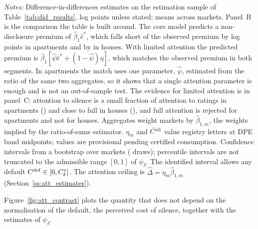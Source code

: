 \begin{table}[htbp]
\centering
\caption{The Non-Disclosure Premium under the Core Model and under Limited Attention}
\label{tab:attention}
\small\renewcommand{\arraystretch}{1.3}


\vspace{0.5em}
\raggedright
\footnotesize
\textit{Notes:} Difference-in-differences estimates on the estimation sample of Table~\ref{tab:did_results}, log points unless stated; means across markets. Panel~B is the comparison the table is built around. The core model predicts a non-disclosure premium of $\hat\beta_1\hat e^*$, which falls short of the observed premium by \attLamApt{} log points in apartments and by \attLamHouse{} in houses. With limited attention the predicted premium is $\hat\beta_1[\hat\psi\hat e^*+(1-\hat\psi)\eta]$, which matches the observed premium in both segments. In apartments the match uses one parameter, $\hat\psi$, estimated from the ratio of the same two aggregates, so it shows that a single attention parameter is enough and is not an out-of-sample test. The evidence for limited attention is in panel~C: attention to silence is a small fraction of attention to ratings in apartments (\attPsiApt{}) and close to full in houses (\attPsiHouse{}), and full attention is rejected for apartments and not for houses. Aggregates weight markets by $\hat\beta_{1,m}$, the weights implied by the ratio-of-sums estimator. $\eta_m$ and $\bar C^{\rm sil}$ value registry letters at DPE band midpoints; values are provisional pending certified consumption. Confidence intervals from a bootstrap over markets (\attNBoot{} draws); percentile intervals are not truncated to the admissible range $[0,1]$ of $\psi_\delta$. The identified interval allows any default $C^{\rm def}\in[0,C^*_\delta]$. The attention ceiling is $\hat\Delta=\eta_m\hat\beta_{1,m}$ (Section~\ref{ss:att_estimates}).
\end{table}


Figure~\ref{fig:att_contrast} plots the quantity that does not depend on the normalisation of the default, the perceived cost of silence, together with the estimates of $\psi_\delta$.

